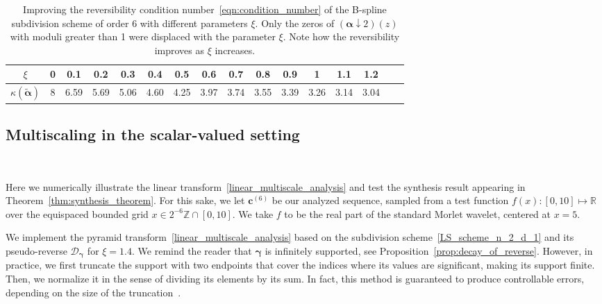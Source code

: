\documentclass[12pt]{article}
\begin{document}
\begin{table}[H]
\begin{center}
    \begin{tabular}{| c || c | c | c | c | c | c | c | c | c | c | c | c | c | c | c |} 
     \hline
     $\xi$ & 0 & 0.1 & 0.2 & 0.3 & 0.4 & 0.5 & 0.6 & 0.7 & 0.8 & 0.9 & 1 & 1.1 & 1.2 \\
     \hline
     $\kappa(\widetilde{\boldsymbol{\alpha}})$ & 8 & 6.59 & 5.69 & 5.06 & 4.60 & 4.25 & 3.97 & 3.74 & 3.55 & 3.39 & 3.26 & 3.14 & 3.04 \\
     \hline
    \end{tabular}
\end{center}
    \caption{Improving the reversibility condition number~\eqref{eqn:condition_number} of the B-spline subdivision scheme of order 6 with different parameters $\xi$. Only the zeros of $(\boldsymbol{\alpha}\downarrow 2)(z)$ with moduli greater than 1 were displaced with the parameter $\xi$. Note how the reversibility improves as $\xi$ increases.}
    \label{table:Bspline_pseudo_reversing_kappa}
\end{table}

\subsection{Multiscaling in the scalar-valued setting}~\label{sec:numerical_linear_multiscaling}

Here we numerically illustrate the linear transform~\eqref{linear_multiscale_analysis} and test the synthesis result appearing in Theorem~\ref{thm:synthesis_theorem}. For this sake, we let $\boldsymbol{c}^{(6)}$ be our analyzed sequence, sampled from a test function $f(x):[0,10]\mapsto\mathbb{R}$ over the equispaced bounded grid $x\in2^{-6}\mathbb{Z}\cap[0, 10]$. We take $f$ to be the real part of the standard Morlet wavelet, centered at $x=5$.

We implement the pyramid transform~\eqref{linear_multiscale_analysis} based on the subdivision scheme~\eqref{LS_scheme_n_2_d_1} and its pseudo-reverse $\mathcal{D}_{\boldsymbol{\gamma}}$ for $\xi=1.4$. We remind the reader that $\boldsymbol{\gamma}$ is infinitely supported, see Proposition~\ref{prop:decay_of_reverse}. However, in practice, we first truncate the support with two endpoints that cover the indices where its values are significant, making its support finite. Then, we normalize it in the sense of dividing its elements by its sum. In fact, this method is guaranteed to produce controllable errors, depending on the size of the truncation~\cite{mattar2023pyramid}.
\end{document}
